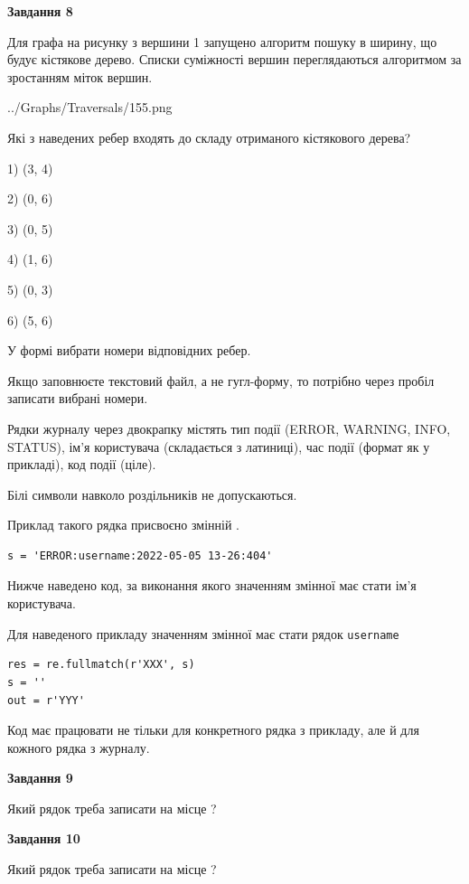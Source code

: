 \documentclass[12pt, ukrainian]{article}
\def\code#1{\Verb!#1!}
\begin{document}
{\begin {large}
{\begin {center}\textbf{Завдання 8}\end {center}}\par
Для графа на рисунку з вершини 1 запущено алгоритм пошуку в ширину, що будує кістякове дерево. Списки суміжності вершин переглядаються алгоритмом за зростанням міток вершин.\par
\begin{center}
	{../Graphs/Traversals/155.png}
\end{center}
\par Які з наведених ребер входять до складу отриманого кістякового дерева?\par
1) (3, 4)\par
2) (0, 6)\par
3) (0, 5)\par
4) (1, 6)\par
5) (0, 3)\par
6) (5, 6)\par
{\vskip 15pt} У формі вибрати номери відповідних ребер.


Якщо заповнюєте текстовий файл, а не гугл-форму, то потрібно через пробіл записа\-ти вибрані номери.\par
\newpage


Рядки журналу через двокрапку містять тип події (ERROR, WARNING, INFO, STATUS), ім'я користувача (складається з латиниці), час події (фор\-мат як у прикладі), код події (ціле).

Білі символи навколо роздільників не допускаються.

Приклад такого рядка присвоєно змінній .



\begin{verbatim}
s = 'ERROR:username:2022-05-05 13-26:404'
\end{verbatim}


Нижче наведено код, за виконання якого значенням змінної  має стати ім'я користувача.

Для наведеного прикладу значенням змінної  має стати рядок \code{username}



\begin{verbatim}
res = re.fullmatch(r'XXX', s)
s = ''
out = r'YYY'
\end{verbatim}


Код має працювати не тільки для конкретного рядка з прикладу, але й для кожного рядка з журналу.

{\begin {center}\textbf{Завдання 9}\end {center}}\par
Який рядок треба записати на місце  ?\par
\vspace{5mm}


{\begin {center}\textbf{Завдання 10}\end {center}}\par
Який рядок треба записати на місце  ?\par


\newpage


\end {large}}
\end{document}
